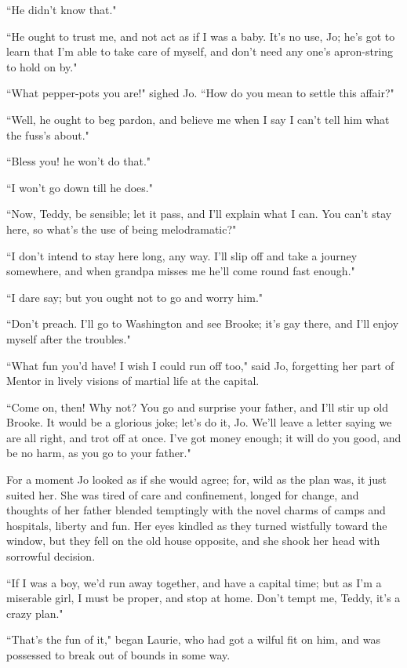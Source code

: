 ``He didn't know that."

``He ought to trust me, and not act as if I was a baby.
It's no use, Jo; he's got to learn that
I'm able to take care of myself, and
don't need any one's apron-string to
hold on by."

``What pepper-pots you are!" sighed Jo. ``How do you mean to settle this
affair?"

``Well, he ought to beg pardon, and believe me when I say I
can't tell him what the fuss's about."

``Bless you! he won't do that."

``I won't go down till he does."

``Now, Teddy, be sensible; let it pass, and I'll explain
what I can. You can't stay here, so
what's the use of being melodramatic?"

``I don't intend to stay here long, any way.
I'll slip off and take a journey somewhere, and when
grandpa misses me he'll come round fast enough."

``I dare say; but you ought not to go and worry him."

``Don't preach. I'll go to Washington and
see Brooke; it's gay there, and I'll
enjoy myself after the troubles."

``What fun you'd have! I wish I could run off too," said
Jo, forgetting her part of Mentor in lively visions of martial life at
the capital.

``Come on, then! Why not? You go and surprise your father, and
I'll stir up old Brooke. It would be a glorious joke;
let's do it, Jo. We'll leave a letter
saying we are all right, and trot off at once. I've got
money enough; it will do you good, and be no harm, as you go to your
father."

For a moment Jo looked as if she would agree; for, wild as the plan was,
it just suited her. She was tired of care and confinement, longed for
change, and thoughts of her father blended temptingly with the novel
charms of camps and hospitals, liberty and fun. Her eyes kindled as they
turned wistfully toward the window, but they fell on the old house
opposite, and she shook her head with sorrowful decision.

``If I was a boy, we'd run away together, and have a
capital time; but as I'm a miserable girl, I must be
proper, and stop at home. Don't tempt me, Teddy,
it's a crazy plan."

``That's the fun of it," began Laurie, who had got a
wilful fit on him, and was possessed to break out of bounds in some way.

